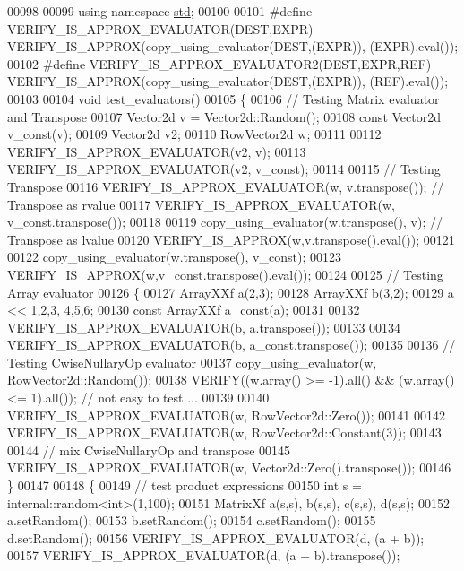 \begin{DoxyCode}
00098 
00099 \textcolor{keyword}{using namespace }\hyperlink{namespacestd}{std};
00100 
00101 \textcolor{preprocessor}{#define VERIFY\_IS\_APPROX\_EVALUATOR(DEST,EXPR) VERIFY\_IS\_APPROX(copy\_using\_evaluator(DEST,(EXPR)),
       (EXPR).eval());}
00102 \textcolor{preprocessor}{#define VERIFY\_IS\_APPROX\_EVALUATOR2(DEST,EXPR,REF) VERIFY\_IS\_APPROX(copy\_using\_evaluator(DEST,(EXPR)),
       (REF).eval());}
00103 
00104 \textcolor{keywordtype}{void} test\_evaluators()
00105 \{
00106   \textcolor{comment}{// Testing Matrix evaluator and Transpose}
00107   Vector2d v = Vector2d::Random();
00108   \textcolor{keyword}{const} Vector2d v\_const(v);
00109   Vector2d v2;
00110   RowVector2d w;
00111 
00112   VERIFY\_IS\_APPROX\_EVALUATOR(v2, v);
00113   VERIFY\_IS\_APPROX\_EVALUATOR(v2, v\_const);
00114 
00115   \textcolor{comment}{// Testing Transpose}
00116   VERIFY\_IS\_APPROX\_EVALUATOR(w, v.transpose()); \textcolor{comment}{// Transpose as rvalue}
00117   VERIFY\_IS\_APPROX\_EVALUATOR(w, v\_const.transpose());
00118 
00119   copy\_using\_evaluator(w.transpose(), v); \textcolor{comment}{// Transpose as lvalue}
00120   VERIFY\_IS\_APPROX(w,v.transpose().eval());
00121 
00122   copy\_using\_evaluator(w.transpose(), v\_const);
00123   VERIFY\_IS\_APPROX(w,v\_const.transpose().eval());
00124 
00125   \textcolor{comment}{// Testing Array evaluator}
00126   \{
00127     ArrayXXf a(2,3);
00128     ArrayXXf b(3,2);
00129     a << 1,2,3, 4,5,6;
00130     \textcolor{keyword}{const} ArrayXXf a\_const(a);
00131 
00132     VERIFY\_IS\_APPROX\_EVALUATOR(b, a.transpose());
00133 
00134     VERIFY\_IS\_APPROX\_EVALUATOR(b, a\_const.transpose());
00135 
00136     \textcolor{comment}{// Testing CwiseNullaryOp evaluator}
00137     copy\_using\_evaluator(w, RowVector2d::Random());
00138     VERIFY((w.array() >= -1).all() && (w.array() <= 1).all()); \textcolor{comment}{// not easy to test ...}
00139 
00140     VERIFY\_IS\_APPROX\_EVALUATOR(w, RowVector2d::Zero());
00141 
00142     VERIFY\_IS\_APPROX\_EVALUATOR(w, RowVector2d::Constant(3));
00143     
00144     \textcolor{comment}{// mix CwiseNullaryOp and transpose}
00145     VERIFY\_IS\_APPROX\_EVALUATOR(w, Vector2d::Zero().transpose());
00146   \}
00147 
00148   \{
00149     \textcolor{comment}{// test product expressions}
00150     \textcolor{keywordtype}{int} s = internal::random<int>(1,100);
00151     MatrixXf a(s,s), b(s,s), c(s,s), d(s,s);
00152     a.setRandom();
00153     b.setRandom();
00154     c.setRandom();
00155     d.setRandom();
00156     VERIFY\_IS\_APPROX\_EVALUATOR(d, (a + b));
00157     VERIFY\_IS\_APPROX\_EVALUATOR(d, (a + b).transpose());

\end{DoxyCode}
